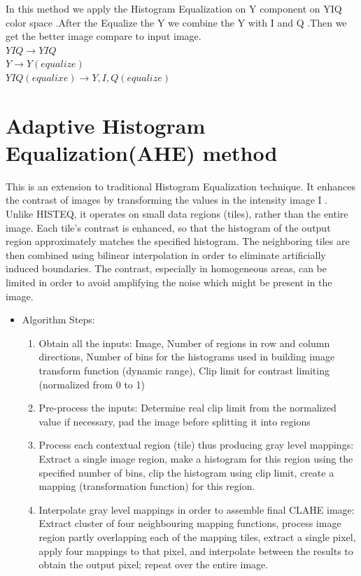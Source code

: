 \begin{itemize}
			In this method we apply the Histogram Equalization on Y component on YIQ
			color space .After the Equalize the Y we combine the Y with I and Q .Then we get the better image compare to 				input image.\\
			$YIQ \rightarrow YIQ$\\
			$Y \rightarrow Y(equalize)$\\
			$YIQ(equalixe) \rightarrow Y, I, Q(equalize)$\\
\end{itemize}

\section{Adaptive Histogram Equalization(AHE) method}
This is an extension to traditional Histogram Equalization
technique. It enhances the contrast of images by transforming
the values in the intensity image I \cite{ie1}. Unlike HISTEQ, it operates
on small data regions (tiles), rather than the entire image. Each
tile's contrast is enhanced, so that the histogram\cite{he1} of the output
region approximately matches the specified histogram. The
neighboring tiles are then combined using bilinear interpolation
in order to eliminate artificially induced boundaries.
The contrast, especially in homogeneous areas, can be limited
in order to avoid amplifying the noise which might be present
in the image\cite{he2}.
\begin{itemize}
	\item Algorithm Steps:
	\begin{enumerate}
		\item Obtain all the inputs: Image, Number of regions in row and column directions, Number of bins for the 	
		histograms used in building image transform function (dynamic range), Clip limit for contrast limiting (normalized 	
		from 0 to 1)
		\item Pre-process the inputs: Determine real clip limit from the normalized value if necessary, pad the image 
		before splitting it into regions
		\item Process each contextual region (tile) thus producing gray level mappings: Extract a single image region, make 
		a histogram for this region using the specified number of bins, clip the histogram using clip limit, create a 
		mapping (transformation function) for this region.
		\item Interpolate gray level mappings in order to assemble final CLAHE image: Extract cluster of four neighbouring 
		mapping functions, process image region partly overlapping each of the mapping tiles, extract a single pixel, apply
		four mappings to that pixel, and interpolate between the results to obtain the output pixel; repeat over the entire 
		image.
	\end{enumerate}
\end{itemize}

